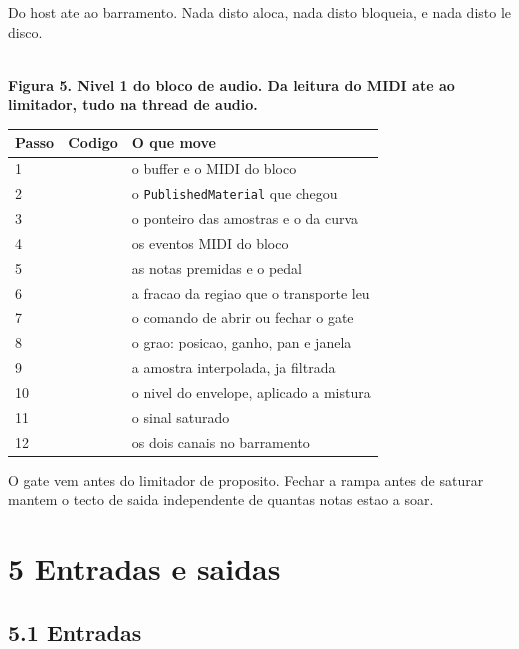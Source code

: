 \documentclass[11pt,a4paper,landscape]{article}
\newcommand{\figura}[2]{%
  \sbox{\figbox}{}%
  \pgfmathsetmacro{\atlasw}{\the\wd\figbox}%
  \pgfmathsetmacro{\atlasalt}{\the\ht\figbox + \the\dp\figbox}%
  \pgfmathsetmacro{\atlaslin}{\the\linewidth}%
  \pgfmathsetmacro{\atlask}{min(\atlaslin/\atlasw, 432.00168/\atlasalt)}%
  \pgfmathsetmacro{\atlasnw}{\atlasw*\atlask}%
  \begin{center}%
  \resizebox{\atlasnw pt}{!}{\usebox{\figbox}}\\[5pt]
  {\footnotesize\bfseries #2}%
  \end{center}%
}
\begin{document}
Do host ate ao barramento. Nada disto aloca, nada disto bloqueia, e nada
disto le disco.

\figura{dataflow-l1-audio}{Figura 5. Nivel 1 do bloco de audio. Da leitura do MIDI ate ao limitador, tudo na thread de audio.}

\begin{center}
\begin{tabular}{@{}L{1.4cm}L{7.0cm}L{16.6cm}@{}}
\toprule
{}
\textbf{Passo} & \textbf{Codigo} & \textbf{O que move} \\
 &  & o buffer e o MIDI do bloco \\
2 &  & o \texttt{PublishedMaterial} que chegou \\
3 &  & o ponteiro das amostras e o da curva \\
4 &  & os eventos MIDI do bloco \\
5 &  & as notas premidas e o pedal \\
6 &  & a fracao da regiao que o transporte leu \\
7 &  & o comando de abrir ou fechar o gate \\
8 &  & o grao: posicao, ganho, pan e janela \\
9 &  & a amostra interpolada, ja filtrada \\
10 &  & o nivel do envelope, aplicado a mistura \\
11 &  & o sinal saturado \\
12 &  & os dois canais no barramento \\
\bottomrule
\end{tabular}
\end{center}

O gate vem antes do limitador de proposito. Fechar a rampa antes de saturar
mantem o tecto de saida independente de quantas notas estao a soar.

\section*{5 Entradas e saidas}

\subsection*{5.1 Entradas}
\end{document}
